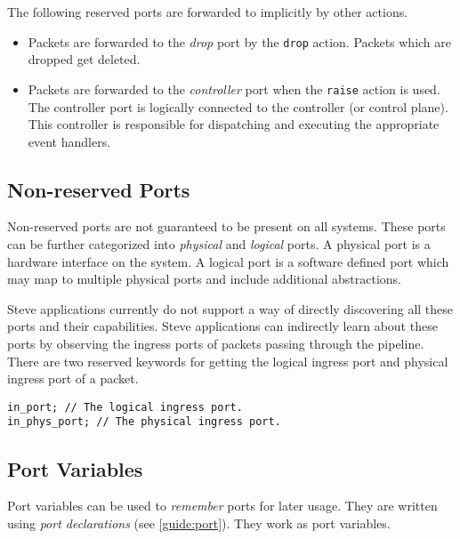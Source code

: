 The following reserved ports are forwarded to implicitly by other actions.

\begin{itemize}
\item Packets are forwarded to the \textit{drop} port by the \texttt{drop} action.
Packets which are dropped get deleted.

\item Packets are forwarded to the \textit{controller} port when the 
\texttt{raise} action is used.
The controller port is logically connected to the controller (or control plane).
This controller is responsible for dispatching and executing the 
appropriate event handlers.
\end{itemize}

\subsection{Non-reserved Ports} \label{tut:regular_ports}

Non-reserved ports are not guaranteed to be present on all systems.
These ports can be further categorized into \textit{physical} and
\textit{logical} ports. A physical port is a hardware interface on the system. A
logical port is a software defined port which may map to multiple physical ports
and include additional abstractions.

Steve applications currently do not support a way of directly discovering all
these ports and their capabilities. Steve applications can indirectly learn
about these ports by observing the ingress ports of packets passing
through the pipeline.
There are two reserved keywords for getting the logical ingress port and physical ingress port of a packet.

\begin{codepage}
\begin{lstlisting}
in_port; // The logical ingress port.
in_phys_port; // The physical ingress port.
\end{lstlisting}
\end{codepage}

\subsection{Port Variables} \label{tut:declared_ports}

Port variables can be used to \textit{remember} ports for later usage. They are
written using \textit{port declarations} (see \ref{guide:port}).
They work as port variables.

